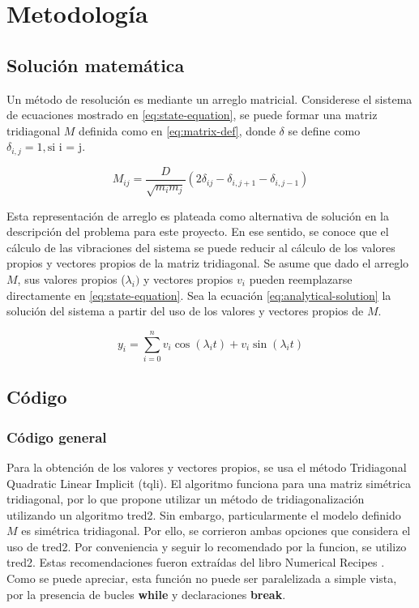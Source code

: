 \section{Metodología}
\subsection{Solución matemática}

Un método de resolución es mediante un arreglo matricial. Considerese el sistema de ecuaciones mostrado en \ref{eq:state-equation}, se puede formar una matriz tridiagonal $M$ definida como en \ref{eq:matrix-def}, donde $\delta$ se define como $\delta_{i,j} = 1, \text{si i = j}$.

\begin{equation}
	M_{ij} = \frac{D}{\sqrt{m_i m_j}} (2 \delta_{ij} - \delta_{i, j+1} - \delta_{i, j-1}) 
	\label{eq:matrix-def}
\end{equation}

Esta representación de arreglo es plateada como alternativa de solución en la descripción del problema para este proyecto. En ese sentido, se conoce que el cálculo de las vibraciones del sistema se puede reducir al cálculo de los valores propios y vectores propios de la matriz tridiagonal. Se asume que dado el arreglo $M$, sus valores propios ($\lambda_i)$ y vectores propios $v_i$ pueden reemplazarse directamente en \ref{eq:state-equation}. Sea la ecuación \ref{eq:analytical-solution} la solución del sistema a partir del uso de los valores y vectores propios de $M$. 

\begin{equation}
	y_{i} = \sum^{n}_{i=0} v_i \cos(\lambda_i t ) + v_i \sin(\lambda_i t )  
	\label{eq:analytical-solution}
\end{equation}

\subsection{Código}
\subsubsection{Código general}

Para la obtención de los valores y vectores propios, se usa el método Tridiagonal Quadratic Linear Implicit (tqli). El algoritmo funciona para una matriz simétrica tridiagonal, por lo que propone utilizar un método de tridiagonalización utilizando un algoritmo tred2. Sin embargo, particularmente el modelo definido $M$ es simétrica tridiagonal. Por ello, se corrieron ambas opciones que considera el uso de tred2. Por conveniencia y seguir lo recomendado por la funcion, se utilizo tred2. Estas recomendaciones fueron extraídas del libro Numerical Recipes \cite{press2007numerical}. Como se puede apreciar, esta función no puede ser paralelizada a simple vista, por la presencia de bucles \textbf{while} y declaraciones \textbf{break}. 

